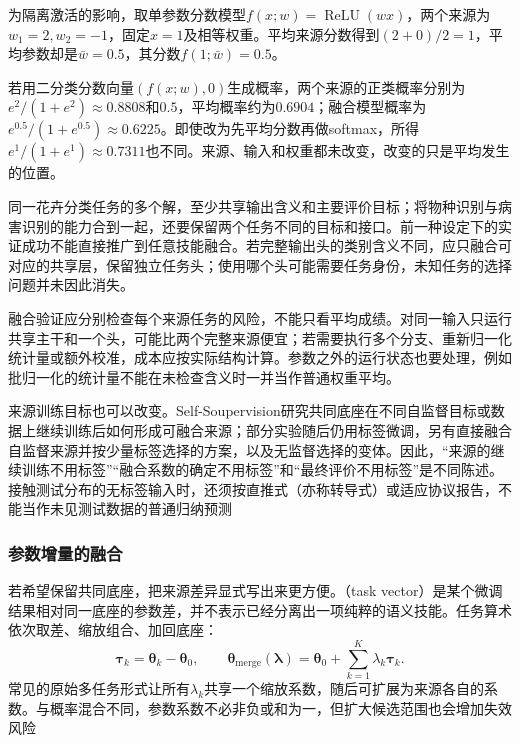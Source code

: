 \begin{example}[非线性使两种平均不相等]
  \label{ex:ket-integration-nonlinear-average}
  为隔离激活的影响，取单参数分数模型$f(x;w)=\operatorname{ReLU}(wx)$，两个来源为$w_1=2,w_2=-1$，固定$x=1$及相等权重。平均来源分数得到$(2+0)/2=1$，平均参数却是$\bar w=0.5$，其分数$f(1;\bar w)=0.5$。

  若用二分类分数向量$(f(x;w),0)$生成概率，两个来源的正类概率分别为$e^2/(1+e^2)\approx0.8808$和$0.5$，平均概率约为$0.6904$；融合模型概率为$e^{0.5}/(1+e^{0.5})\approx0.6225$。即使改为先平均分数再做softmax，所得$e^1/(1+e^1)\approx0.7311$也不同。来源、输入和权重都未改变，改变的只是平均发生的位置。
\end{example}

同一花卉分类任务的多个解，至少共享输出含义和主要评价目标；将物种识别与病害识别的能力合到一起，还要保留两个任务不同的目标和接口。前一种设定下的实证成功不能直接推广到任意技能融合。若完整输出头的类别含义不同，应只融合可对应的共享层，保留独立任务头；使用哪个头可能需要任务身份，未知任务的选择问题并未因此消失。

融合验证应分别检查每个来源任务的风险，不能只看平均成绩。对同一输入只运行共享主干和一个头，可能比两个完整来源便宜；若需要执行多个分支、重新归一化统计量或额外校准，成本应按实际结构计算。参数之外的运行状态也要处理，例如批归一化的统计量不能在未检查含义时一并当作普通权重平均。

来源训练目标也可以改变。Self-Soupervision研究共同底座在不同自监督目标或数据上继续训练后如何形成可融合来源；部分实验随后仍用标签微调，另有直接融合自监督来源并按少量标签选择的方案，以及无监督选择的变体。因此，“来源的继续训练不用标签”“融合系数的确定不用标签”和“最终评价不用标签”是不同陈述。接触测试分布的无标签输入时，还须按直推式（亦称转导式）或适应协议报告，不能当作未见测试数据的普通归纳预测

\subsubsection{参数增量的融合}
\label{sec:ket-integration-deltas}

若希望保留共同底座，把来源差异显式写出来更方便。（task vector）是某个微调结果相对同一底座的参数差，并不表示已经分离出一项纯粹的语义技能。任务算术依次取差、缩放组合、加回底座：
\begin{equation}
  \bm{\tau}_k=\bm{\theta}_k-\bm{\theta}_0,\qquad
  \bm{\theta}_{\mathrm{merge}}(\bm{\lambda})
    =\bm{\theta}_0+\sum_{k=1}^{K}\lambda_k\bm{\tau}_k.
  \label{eq:ket-integration-task-arithmetic}
\end{equation}
常见的原始多任务形式让所有$\lambda_k$共享一个缩放系数，随后可扩展为来源各自的系数。与概率混合不同，参数系数不必非负或和为一，但扩大候选范围也会增加失效风险

